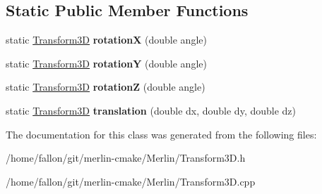 \subsection*{Static Public Member Functions}
\begin{DoxyCompactItemize}
\item 
\mbox{\label{classTransform3D_a6a773031c5f0c2e0a1a2cda2b9c0853d}} 
static \hyperlink{classTransform3D}{Transform3D} {\bfseries rotationX} (double angle)
\item 
\mbox{\label{classTransform3D_a5f074bf9f87fc0d5b4a6e5f4944795f6}} 
static \hyperlink{classTransform3D}{Transform3D} {\bfseries rotationY} (double angle)
\item 
\mbox{\label{classTransform3D_aa600266a01b621a4586afe33e9fbdbb7}} 
static \hyperlink{classTransform3D}{Transform3D} {\bfseries rotationZ} (double angle)
\item 
\mbox{\label{classTransform3D_ac9109843545afaf27f33855a4eb7f46d}} 
static \hyperlink{classTransform3D}{Transform3D} {\bfseries translation} (double dx, double dy, double dz)
\end{DoxyCompactItemize}


The documentation for this class was generated from the following files\+:\begin{DoxyCompactItemize}
\item 
/home/fallon/git/merlin-\/cmake/\+Merlin/Transform3\+D.\+h\item 
/home/fallon/git/merlin-\/cmake/\+Merlin/Transform3\+D.\+cpp\end{DoxyCompactItemize}
